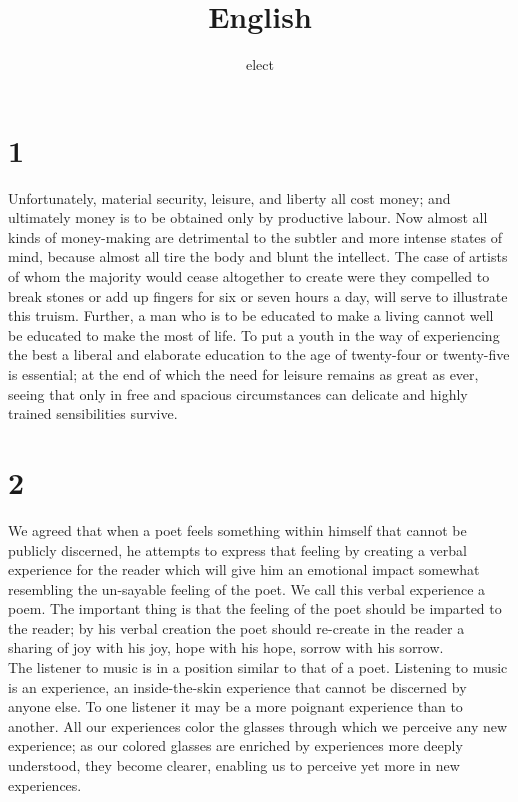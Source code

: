 \documentclass{scrartcl}
\author{elect}
\date{}
\title{English}
\begin{document}
\maketitle


\section{1}
\label{sec:org905ea82}
Unfortunately, material security, leisure, and liberty all cost money; and ultimately money is to be obtained only by productive labour. Now almost all kinds of money-making are detrimental to the subtler and more intense states of mind, because almost all tire the body and blunt the intellect. The case of artists of whom the majority would cease altogether to create were they compelled to break stones or add up fingers for six or seven hours a day, will serve to illustrate this truism. Further, a man who is to be educated to make a living cannot well be educated to make the most of life. To put a youth in the way of experiencing the best a liberal and elaborate education to the age of twenty-four or twenty-five is essential; at the end of which the need for leisure remains as great as ever, seeing that only in free and spacious circumstances can delicate and highly trained sensibilities survive.\\


\section{2}
\label{sec:orgf423838}
We agreed that when a poet feels something within himself that cannot be publicly discerned, he attempts to express that feeling by creating a verbal experience for the reader which will give him an emotional impact somewhat resembling the un-sayable feeling of the poet. We call this verbal experience a poem. The important thing is that the feeling of the poet should be imparted to the reader; by his verbal creation the poet should re-create in the reader a sharing of joy with his joy, hope with his hope, sorrow with his sorrow.\\
The listener to music is in a position similar to that of a poet. Listening to music is an experience, an inside-the-skin experience that cannot be discerned by anyone else. To one listener it may be a more poignant experience than to another. All our experiences color the glasses through which we perceive any new experience; as our colored glasses are enriched by experiences more deeply understood, they become clearer, enabling us to perceive yet more in new experiences.\\
\end{document}
